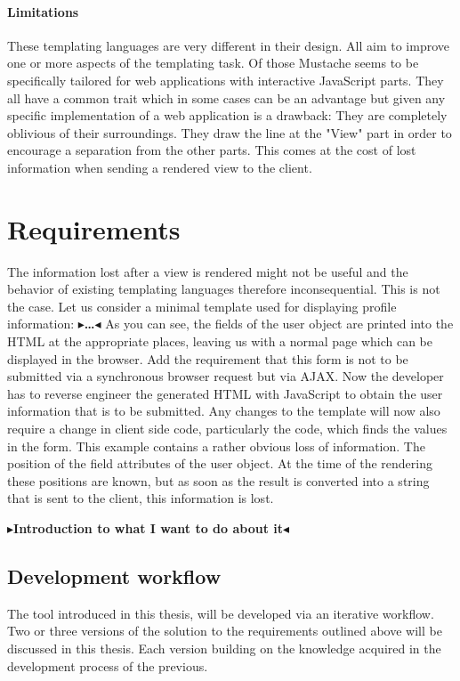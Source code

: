 \documentclass[twoside,11pt,openright]{report}
\newcommand{\todo}[1]{{\color[rgb]{.5,0,0}\textbf{$\blacktriangleright$#1$\blacktriangleleft$}}}
\begin{document}
\subsubsection{Limitations}
These templating languages are very different in their design.
All aim to improve one or more aspects of the templating task.
Of those Mustache seems to be specifically tailored for web applications
with interactive JavaScript parts.
They all have a common trait which in some cases can be an advantage
but given any specific implementation of a web application is a drawback:
They are completely oblivious of their surroundings. They draw the line
at the "View" part in order to encourage a separation from the other
parts. This comes at the cost of lost information when sending a
rendered view to the client.


\chapter{Requirements}
The information lost after a view is rendered might not be useful and
the behavior of existing templating languages therefore inconsequential.
This is not the case. Let us consider a minimal template used for
displaying profile information:
\todo{\dots}
As you can see, the fields of the user object are printed into the HTML
at the appropriate places, leaving us with a normal page which can be
displayed in the browser.
Add the requirement that this form is not to be submitted via a
synchronous browser request but via AJAX. Now the developer has to
reverse engineer the generated HTML with JavaScript to obtain the
user information that is to be submitted. Any changes to the template
will now also require a change in client side code, particularly the
code, which finds the values in the form.
This example contains a rather obvious loss of information.
The position of the field attributes of the user object.
At the time of the rendering these positions are known, but as soon as the
result is converted into a string that is sent to the client, this
information is lost.

\todo{Introduction to what I want to do about it}

\section{Development workflow}
The tool introduced in this thesis, will be developed via an iterative
workflow. Two or three versions of the solution to the requirements outlined
above will be discussed in this thesis. Each version building on the knowledge
acquired in the development process of the previous.
\end{document}
